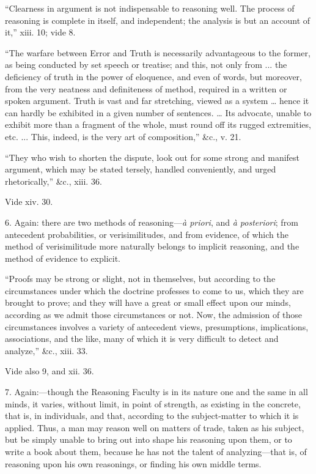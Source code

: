 ``Clearness in argument is not indispensable to reasoning
well. The process of reasoning is complete in itself, and
independent; the analysis is but an account of it,'' xiii. 10;
vide 8.


``The warfare between Error and Truth is necessarily
advantageous to the former, as being conducted by set speech or
treatise; and this, not only from ... the deficiency of truth in the
power of eloquence, and even of words, but moreover, from the very
neatness and definiteness of method, required in a written or spoken
argument. Truth is vast and far stretching, viewed as a system …
hence it can hardly be exhibited in a given number of sentences. …
Its advocate, unable to exhibit more than a fragment of the whole,
must round off its rugged extremities, etc. ... This, indeed, is the
very art of composition,'' \&c., v. 21.


``They who wish to shorten the dispute, look out for some
strong and manifest argument, which may be stated tersely, handled
conveniently, and urged rhetorically,'' \&c., xiii. 36.


Vide xiv. 30.


6. Again: there are two methods of reasoning—\emph{à priori},
and \emph{à posteriori}; from antecedent probabilities, or
verisimilitudes, and from evidence, of which the method of
verisimilitude more naturally belongs to implicit reasoning, and the
method of evidence to explicit.


``Proofs may be strong or slight, not in themselves, but
according to the circumstances under which the doctrine professes to
come to us, which they are brought to prove; and they will have a
great or small effect upon our minds, according as we admit those
circumstances or not. Now, the admission of those circumstances
involves a variety of antecedent views, presumptions, implications,
associations, and the like, many of which it is very difficult to
detect and analyze,'' \&c., xiii. 33.


Vide also 9, and xii. 36.


7. Again:—though the Reasoning Faculty is in its nature one and
the same in all minds, it varies, without limit, in point of strength,
as existing in the concrete, that is, in individuals, and that,
according to the subject-matter to which it is applied. Thus, a man
may reason well on matters of trade, taken as his subject, but be
simply unable to bring out into shape his reasoning upon them, or to
write a book about them, because he has not the talent of analyzing—that
is, of reasoning upon his own reasonings, or finding his own middle
terms.


